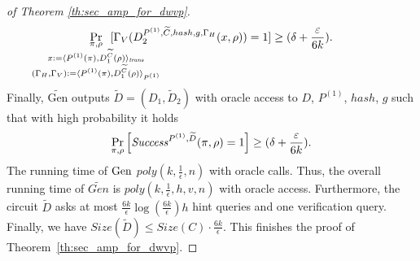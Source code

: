 \begin{proof}[of Theorem \ref{th:sec_amp_for_dwvp}]
\begin{align}
  \label{eq:succ_prob_d}
    \underset{
      \mathclap{
      \substack{\pi, \rho \\ x := \langle P^{(1)}(\pi), D_1^{\widetilde{C}}(\rho) \rangle_{\mathit{trans}} \\
        (\Gamma_H, \Gamma_V) := \langle P^{(1)}(\pi), D_1^{\widetilde{C}}(\rho) \rangle_{P^{(1)}}}}}
    {\Pr}\mkern13mu[\Gamma_V(D_2^{P^{(1)}, \widetilde{C}, hash, g, \Gamma_H}(x, \rho)) = 1] \geq (\delta + \frac{\varepsilon}{6k}).
\end{align}
Finally, $\widetilde{\text{Gen}}$ outputs $\widetilde{D} = (D_1, \widetilde{D}_2)$ with oracle access to $D$, $P^{(1)}$, $hash$, $g$ such that with high probability it holds
\begin{align*}
    \underset{\pi, \rho}{\Pr}\left[\operatorname{\mathit{Success}}^{P^{(1)},\widetilde{D}}(\pi, \rho) = 1\right] \geq (\delta + \frac{\varepsilon}{6k}).
\end{align*}
The running time of $\operatorname{\text{Gen}}$ $\mathit{poly(k, \frac{1}{\epsilon}, n)}$ with oracle calls.
Thus, the overall running time of $\widetilde{\mathit{Gen}}$ is  $\mathit{poly(k,\frac{1}{\epsilon},h,v,n)}$ with oracle access.
Furthermore, the circuit $\widetilde{D}$ asks at most $\frac{6k}{\epsilon} \log(\frac{6k}{\epsilon})h$ hint queries and one verification query.
Finally, we have $\mathit{Size}(\widetilde{D}) \leq \mathit{Size}(C) \cdot \frac{6k}{\epsilon}$.
This finishes the proof of Theorem~\ref{th:sec_amp_for_dwvp}.
\end{proof}

